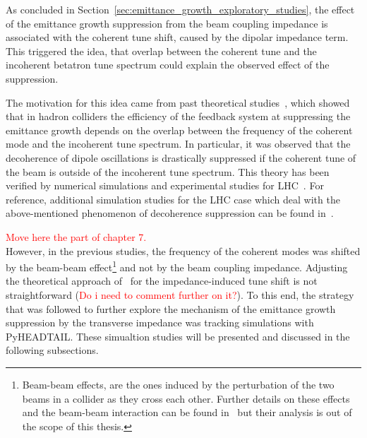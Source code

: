 As concluded in Section~\ref{sec:emittance_growth_exploratory_studies}, the effect of the emittance growth suppression from the beam coupling impedance is associated with the coherent tune shift, caused by the dipolar impedance term. This triggered the idea, that overlap between the coherent tune and the incoherent betatron tune spectrum could explain the observed effect of the suppression. 

The motivation for this idea came from past theoretical studies~\cite{Alexahin:314169, Alexahin:485304}, which showed that in hadron colliders the efficiency of the feedback system at suppressing the emittance growth depends on the overlap between the frequency of the coherent mode and the incoherent tune spectrum. In particular, it was observed that the decoherence of dipole oscillations is drastically suppressed if the coherent tune of the beam is outside of the incoherent tune spectrum. This theory has been verified by numerical simulations and experimental studies for LHC~\cite{QIANG201853, PhysRevAccelBeams.23.021002, PhysRevAccelBeams.24.011003}. %
For reference, additional simulation studies for the LHC case which deal with the above-mentioned phenomenon of decoherence suppression can be found in~\cite{Alexahin:497415, Herr:486007}. 


\textcolor{red}{Move here the part of chapter 7.}\\
However, in the previous studies, the frequency of the coherent modes was shifted by the beam-beam effect\footnote{Beam-beam effects, are the ones induced by the perturbation of the two beams in a collider as they cross each other. Further details on these effects and the beam-beam interaction can be found in~\cite{Herr:1982430} but their analysis is out of the scope of this thesis.} and not by the beam coupling impedance. Adjusting the theoretical approach of~\cite{Alexahin:314169} for the impedance-induced tune shift is not straightforward (\textcolor{red}{Do i need to comment further on it?}). To this end, the strategy that was followed to further explore the mechanism of the emittance growth suppression by the transverse impedance was tracking simulations with PyHEADTAIL. These simualtion studies will be presented and discussed in the following subsections.


